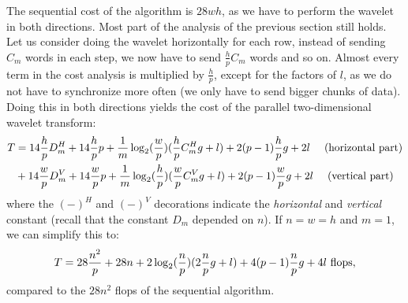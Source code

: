 The sequential cost of the algorithm is $28wh$, as we have to perform the wavelet in both directions. Most part of the analysis of the previous section still holds. Let us consider doing the wavelet horizontally for each row, instead of sending $C_m$ words in each step, we now have to send $\frac{h}{p}C_m$ words and so on. Almost every term in the cost analysis is multiplied by $\frac{h}{p}$, except for the factors of $l$, as we do not have to synchronize more often (we only have to send bigger chunks of data). Doing this in both directions yields the cost of the parallel two-dimensional wavelet transform:
\begin{align*}
	T &= 14\frac{h}{p}D_m^H + 14\frac{h}{p}p + \frac{1}{m}\operatorname{\log_2}(\frac{w}{p})(\frac{h}{p}C_m^Hg+l) + 2(p-1)\frac{h}{p}g + 2l \quad\text{ (horizontal part)}\\
	  &+ 14\frac{w}{p}D_m^V + 14\frac{w}{p}p + \frac{1}{m}\operatorname{\log_2}(\frac{h}{p})(\frac{w}{p}C_m^Vg+l) + 2(p-1)\frac{w}{p}g + 2l \quad\text{ (vertical part)}
\end{align*}
where the $(-)^H$ and $(-)^V$ decorations indicate the \emph{horizontal} and \emph{vertical} constant (recall that the constant $D_m$ depended on $n$). If $n=w=h$ and $m=1$, we can simplify this to:
\[ T = 28\frac{n^2}{p} + 28n + 2\operatorname{\log_2}(\frac{n}{p})(2\frac{n}{p}g+l) + 4(p-1)\frac{n}{p}g + 4l \text{ flops}, \]
compared to the $28n^2$ flops of the sequential algorithm.

